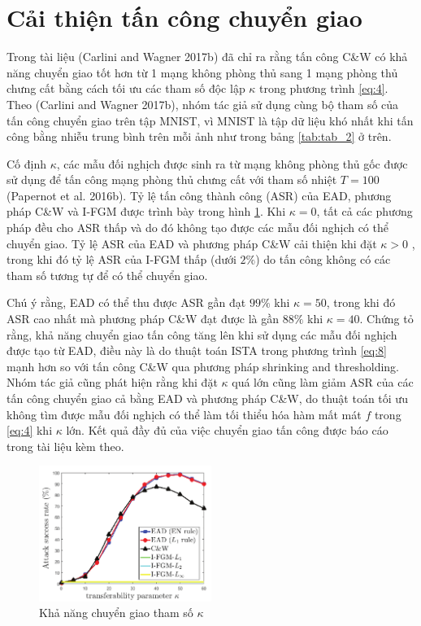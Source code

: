 \section{Cải thiện tấn công chuyển giao}
Trong tài liệu (Carlini and Wagner 2017b) đã chỉ ra rằng tấn công C\&W có khả năng chuyển giao tốt hơn  từ 1 mạng không phòng thủ sang 1 mạng phòng thủ chưng cất bằng cách tối ưu các tham số độc lập $\kappa$ trong phương trình \ref{eq:4}. Theo (Carlini and Wagner 2017b), nhóm tác giả sử dụng cùng bộ tham số của tấn công chuyển giao trên tập MNIST, vì MNIST là tập dữ liệu khó nhất khi tấn công bằng nhiễu trung bình trên mỗi ảnh như trong bảng \ref{tab:tab_2} ở trên.

Cố định $\kappa$, các mẫu đối nghịch được sinh ra từ mạng không phòng thủ gốc được sử dụng để tấn công mạng phòng thủ chưng cất với tham số nhiệt $T = 100$ (Papernot et al. 2016b). Tỷ lệ tấn công thành công (ASR) của EAD, phương pháp C\&W và I-FGM được trình bày trong hình \ref{fig:fg_04}. Khi $\kappa = 0$, tất cả các phương pháp đều cho ASR thấp và do đó không tạo được các mẫu đối nghịch có thể chuyển giao. Tỷ lệ ASR của EAD và phương pháp C\&W cải thiện khi đặt $\kappa > 0$ , trong khi đó tỷ lệ ASR của I-FGM thấp (dưới $2\%$) do tấn công không có các tham số tương tự để có thể chuyển giao.

Chú ý rằng, EAD có thể thu được ASR gần đạt $99\%$ khi $\kappa = 50$, trong khi đó ASR cao nhất mà phương pháp C\&W đạt được là gần $88\%$ khi $\kappa = 40$. Chứng tỏ rằng, khả năng chuyển giao tấn công tăng lên khi sử dụng các mẫu đối nghịch được tạo từ EAD, điều này là do thuật toán ISTA trong phương trình \ref{eq:8} mạnh hơn so với tấn công C\&W qua phương pháp shrinking and thresholding. Nhóm tác giả cũng phát hiện rằng khi đặt $\kappa$ quá lớn cũng làm giảm ASR của các tấn công chuyển giao cả bằng EAD và phương pháp C\&W, do thuật toán tối ưu không tìm được mẫu đối nghịch có thể làm tối thiểu hóa hàm mất mát $f$ trong \ref{eq:4} khi $\kappa$ lớn. Kết quả đầy đủ của việc chuyển giao tấn công được báo cáo trong tài liệu kèm theo.

\begin{figure}[H] %
    \centering %
    \includegraphics[width=0.5\textwidth]{assets/fig_04.png} 
    \caption{Khả năng chuyển giao tham số $\kappa$} %
    \label{fig:fg_04}
\end{figure}